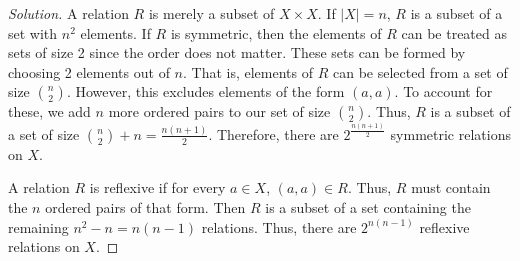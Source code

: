 \documentclass[12pt]{article}
\theoremstyle{definition}
\newenvironment{solution}{
  \begin{proof}[Solution]
    \vspace{-8px}
    \setlength{\parskip}{4px}
    \setlength{\parindent}{0px}
}{
\end{proof}
}
\begin{document}
  \begin{solution}
    A relation \(R\) is merely a subset of \(X \times X\). If \(|X| = n\), \(R\) is a subset of a set with \(n^{2}\) elements. If \(R\) is symmetric, then the elements of \(R\) can be treated as sets of size 2 since the order does not matter. These sets can be formed by choosing 2 elements out of \(n\). That is, elements of \(R\) can be selected from a set of size \({n \choose 2}\). However, this excludes elements of the form \(\left(a, a\right)\). To account for these, we add \(n\) more ordered pairs to our set of size \({n \choose 2}\). Thus, \(R\) is a subset of a set of size \({n \choose 2} + n = \frac{n(n+1)}{2}\). Therefore, there are \(2^{\frac{n(n+1)}{2}}\) symmetric relations on \(X\).


    A relation \(R\) is reflexive if for every \(a \in X\), \(\left(a, a\right) \in R\). Thus, \(R\) must contain the \(n\) ordered pairs of that form. Then \(R\) is a subset of a set containing the remaining \(n^{2} - n = n \left(n - 1\right)\) relations. Thus, there are \(2^{n \left(n - 1\right)}\) reflexive relations on \(X\).
  \end{solution}
\end{document}
